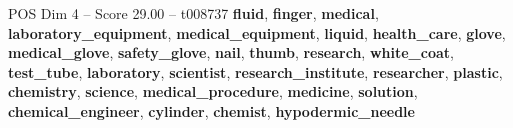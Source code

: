 \begin{textsample}{POS Dim 4 – Score 29.00 – t008737}  \label{ex:f4_pos_015}
\textbf{fluid}, \textbf{finger}, \textbf{medical}, \textbf{laboratory\_equipment}, \textbf{medical\_equipment}, \textbf{liquid}, \textbf{health\_care}, \textbf{glove}, \textbf{medical\_glove}, \textbf{safety\_glove}, \textbf{nail}, \textbf{thumb}, \textbf{research}, \textbf{white\_coat}, \textbf{test\_tube}, \textbf{laboratory}, \textbf{scientist}, \textbf{research\_institute}, \textbf{researcher}, \textbf{plastic}, \textbf{chemistry}, \textbf{science}, \textbf{medical\_procedure}, \textbf{medicine}, \textbf{solution}, \textbf{chemical\_engineer}, \textbf{cylinder}, \textbf{chemist}, \textbf{hypodermic\_needle}

\end{textsample}
